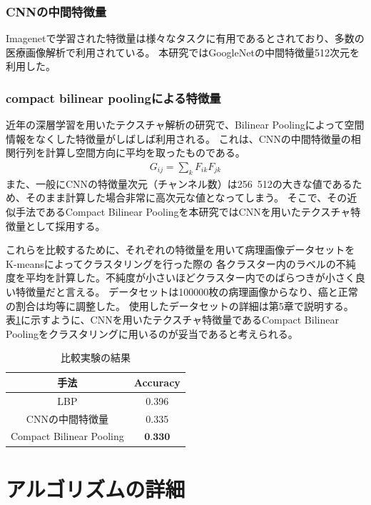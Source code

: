 \subsubsection{CNNの中間特徴量}
Imagenetで学習された特徴量は様々なタスクに有用であるとされており、多数の医療画像解析で利用されている。
本研究ではGoogleNetの中間特徴量512次元を利用した。

\subsubsection{compact bilinear poolingによる特徴量}
近年の深層学習を用いたテクスチャ解析の研究で、Bilinear Poolingによって空間情報をなくした特徴量がしばしば利用される。
これは、CNNの中間特徴量の相関行列を計算し空間方向に平均を取ったものである。
\begin{eqnarray}
G_{ij} = \sum_k{F_{ik} F_{jk}}
\end{eqnarray}
また、一般にCNNの特徴量次元（チャンネル数）は256~512の大きな値であるため、そのまま計算した場合非常に高次元な値となってしまう。
そこで、その近似手法であるCompact Bilinear Pooling\cite{gao2016compact}を本研究ではCNNを用いたテクスチャ特徴量として採用する。

これらを比較するために、それぞれの特徴量を用いて病理画像データセットをK-meansによってクラスタリングを行った際の
各クラスター内のラベルの不純度を平均を計算した。不純度が小さいほどクラスター内でのばらつきが小さく良い特徴量だと言える。
データセットは100000枚の病理画像からなり、癌と正常の割合は均等に調整した。
使用したデータセットの詳細は第5章で説明する。
表\ref{table:compare_feat}に示すように、CNNを用いたテクスチャ特徴量であるCompact Bilinear Poolingをクラスタリングに用いるのが妥当であると考えられる。

\begin{table}[h]
  \label{table:compare_feat}
  \caption{比較実験の結果}
  \center
  \begin{tabular}{c|c} \hline
     手法 & Accuracy \\ \hline
    LBP & 0.396 \\
    CNNの中間特徴量 & 0.335  \\ 
    Compact Bilinear Pooling & $\textbf{0.330}$ \\ \hline
  \end{tabular}
\end{table}

\section{アルゴリズムの詳細}

